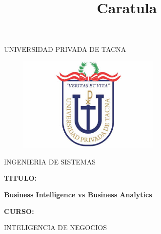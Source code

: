 \documentclass[12pt,letterpaper]{article}
\begin{document}
%


\title{Caratula}

\begin{titlepage}
\begin{center}
\large{UNIVERSIDAD PRIVADA DE TACNA}\\
\vspace*{-0.025in}
\begin{figure}[htb]
\begin{center}
\includegraphics[width=7cm]{./images/logo}
\end{center}
\end{figure}
\vspace*{0.15in}
INGENIERIA DE SISTEMAS  \\

\vspace*{0.3in}
\begin{large}
\textbf{TITULO:} \\
\end{large}

\vspace*{0.1in}
\begin{Large}
\textbf{Business Intelligence vs Business Analytics} \\

\end{Large}

\vspace*{0.3in}
\begin{Large}
\textbf{CURSO:} \\
\end{Large}

\vspace*{0.1in}
\begin{large}
INTELIGENCIA DE NEGOCIOS\\
\end{large}


\end{center}
\end{titlepage}
\end{document}
